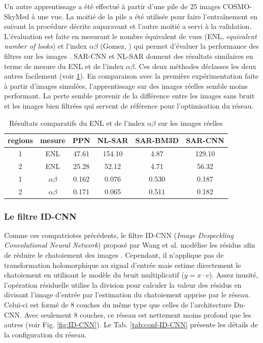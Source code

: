 Un autre apprentissage a été effectué à partir d'une pile de 25 images COSMO-SkyMed à une vue. La moitié de la pile a été utilisée pour faire l'entraînement en suivant la procédure décrite auparavant et l'autre moitié a servi à la validation. L'évaluation est faite en mesurant le nombre équivalent de vues (ENL, \textit{equivalent number of looks}) et l'index $\alpha\beta$ (Gomez, \cite{Gomez2016}) qui permet d'évaluer la performance des filtres sur les images \acrsar. SAR-CNN et NL-SAR donnent des résultats similaires en terme de mesure du ENL et de l'index $\alpha\beta$.  Ces deux méthodes déclasses les deux autres facilement (voir \ref{tab:results-SAR-CNN2}). En comparaison avec la première expérimentation faite à partir d'images simulées, l'apprentissage sur des images réelles semble moins performant. La perte semble provenir de la différence entre les images sans bruit et les images bien filtrées qui servent de référence pour l'optimisation du réseau.   

\begin{table}[h!]
\begin{center}
 \begin{tabular}{||c c c c c c||} 
 \hline
 regions & mesure &PPN & NL-SAR & SAR-BM3D & SAR-CNN \\ [0.5ex] 
 \hline
 1 & ENL &47.61 & 154.10& 4.87& 129.10  \\
 2 & ENL &25.28 & 52.12 & 4.71 & 56.32 \\
 \hline
  1 & $\alpha\beta$ &0.162& 0.076& 0.530& 0.187 \\
 2 & $\alpha\beta$ &0.171&0.065& 0.511& 0.182 \\
  \hline
\end{tabular}
\end{center}
  \caption{Résultats comparatifs du ENL et de l'index $\alpha\beta$ sur les images \acrsar réelles}
  \label{tab:results-SAR-CNN2}
\end{table}

\subsubsection{Le filtre ID-CNN}

Comme ces compatriotes précédents, le filtre ID-CNN (\textit{Image Despeckling Convolutional Neural Network}) proposé par Wang et al. \cite{Wang2017IDCNN} modélise les résidus afin de réduire le chatoiement des images \acrsar. Cependant, il n'applique pas de transformation holomorphique au signal d'entrée mais estime directement le chatoiement en utilisant le modèle du bruit multiplicatif ($y=x \cdot v$). Assez inusité, l'opération résiduelle utilise la division pour calculer la valeur des résidus en divisant l'image d'entrée par l'estimation du chatoiement apprise par le réseau. Celui-ci est formé de 8 couches du même type que celles de l'architecture Dn-CNN.  Avec seulement 8 couches, ce réseau est nettement moins profond que les autres (voir Fig. \ref{fig:ID-CNN}). Le Tab. \ref{tab:conf-ID-CNN} présente les détails de la configuration du réseau.

